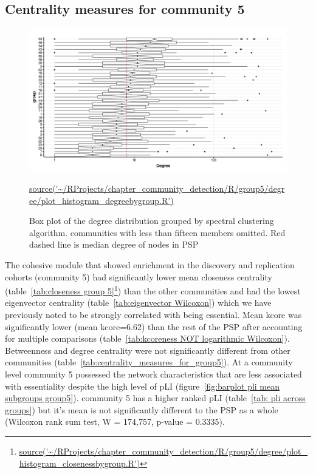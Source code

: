 \clearpage


\subsection{Centrality measures for community 5}
\label{sec: centrality measures for group 5}

\begin{figure}
    \centering
    \includegraphics[width=\textwidth]{images/chaptercommunity/ggplot2/degreebygroup/Rplot_degree_theme_degree_label.png}
    \caption[Boxplot of degree grouped by spectral cluster]{Box plot of the degree distribution grouped by spectral clustering algorithm. communities with less than fifteen members omitted. Red dashed line is median degree of nodes in PSP}
    \tiny\url{source('~/RProjects/chapter_community_detection/R/group5/degree/plot_histogram_degreebygroup.R')}
    \label{fig:my_label}
\end{figure}


The cohesive module that showed enrichment in the discovery and replication cohorts (community 5) had significantly lower mean closeness centrality (table~\ref{tab:closeness group 5}\footnote{\tiny\url{source('~/RProjects/chapter_community_detection/R/group5/degree/plot_histogram_closenessbygroup.R')}}) than the other communities and had the lowest eigenvector centrality (table~\ref{tab:eigenvector Wilcoxon}) which we have previously noted to be strongly correlated with being essential. Mean kcore was significantly lower (mean kcore=6.62) than the rest of the PSP after accounting for multiple comparisons (table~\ref{tab:kcoreness NOT logarithmic Wilcoxon}). Betweenness and degree centrality were not significantly different from other communities (table~\ref{tab:centrality_measures_for_group5}). At a community level community 5 possessed the network characteristics that are less associated with essentiality despite the high level of pLI (figure~\ref{fig:barplot pli mean subgroups group5}). community 5 has a higher ranked pLI (table~\ref{tab: pli across groups}) but it's mean is not significantly different to the PSP as a whole (Wilcoxon rank sum test, W = 174,757, p-value = 0.3335). 





